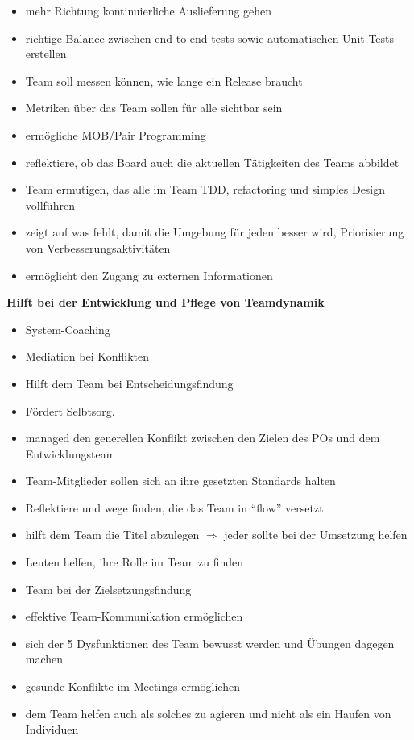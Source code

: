 \begin{itemize}
  \item mehr Richtung kontinuierliche Auslieferung gehen
  \item richtige Balance zwischen end-to-end tests sowie automatischen Unit-Tests erstellen
  \item Team soll messen können, wie lange ein Release braucht
  \item Metriken über das Team sollen für alle sichtbar sein
  \item ermögliche MOB/Pair Programming
  \item reflektiere, ob das Board auch die aktuellen Tätigkeiten des Teams  abbildet
  \item Team ermutigen, das alle im Team TDD, refactoring und simples Design vollführen
  \item zeigt auf was fehlt, damit die Umgebung für jeden besser wird, Priorisierung von
    Verbesserungsaktivitäten
  \item ermöglicht den Zugang zu externen Informationen
\end{itemize}


\textbf{Hilft bei der Entwicklung und Pflege von Teamdynamik}


\begin{itemize}
  \item System-Coaching
  \item Mediation bei Konflikten
  \item Hilft dem Team bei Entscheidungsfindung
  \item Fördert Selbtsorg.
  \item managed den generellen Konflikt zwischen den Zielen des POs und dem Entwicklungsteam
  \item Team-Mitglieder sollen sich an ihre gesetzten Standards halten
  \item Reflektiere und wege finden, die das Team in \enquote{flow} versetzt
  \item hilft dem Team die Titel abzulegen $\Rightarrow$  jeder sollte bei der Umsetzung helfen
  \item Leuten helfen, ihre Rolle im Team zu finden
  \item Team bei der Zielsetzungsfindung
  \item effektive Team-Kommunikation ermöglichen
  \item sich der 5 Dysfunktionen des Team bewusst werden und Übungen dagegen machen
  \item gesunde Konflikte im Meetings ermöglichen
  \item dem Team helfen auch als solches zu agieren und nicht als ein Haufen von Individuen
\end{itemize}


